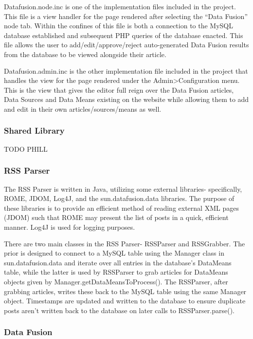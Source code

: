 \documentclass[11pt]{article} %
\begin{document}
Datafusion.node.inc is one of the implementation files included in the project.  This file is a view handler for the page rendered after selecting the “Data Fusion” node tab. Within the confines of this file is both a connection to the MySQL database established and subsequent PHP queries of the database enacted. This file allows the user to add/edit/approve/reject auto-generated Data Fusion results from the database to be viewed alongside their article.

Datafusion.admin.inc is the other implementation file included in the project that handles the view for the page rendered under the Admin>Configuration menu. This is the view that gives the editor full reign over the Data Fusion articles, Data Sources and Data Means existing on the website while allowing them to add and edit in their own articles/sources/means as well.

\subsubsection{Shared Library}

TODO PHILL

\subsubsection{RSS Parser}

The RSS Parser is written in Java, utilizing some external libraries- specifically, ROME, JDOM, Log4J, and the sun.datafusion.data libraries. The purpose of these libraries is to provide an efficient method of reading external XML pages (JDOM) such that ROME may present the list of posts in a quick, efficient manner. Log4J is used for logging purposes.

There are two main classes in the RSS Parser- RSSParser and RSSGrabber. The prior is designed to connect to a MySQL table using the Manager class in sun.datafusion.data and iterate over all entries in the database’s DataMeans table, while the latter is used by RSSParser to grab articles for DataMeans objects given by Manager.getDataMeansToProcess(). The RSSParser, after grabbing articles, writes these back to the MySQL table using the same Manager object. Timestamps are updated and written to the database to ensure duplicate posts aren’t written back to the database on later calls to RSSParser.parse().

\subsubsection{Data Fusion}
\end{document}
